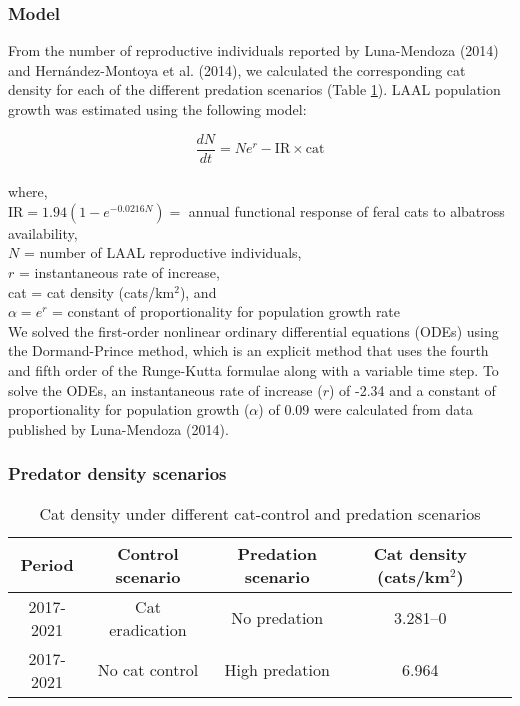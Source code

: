 \documentclass{article}
\begin{document}
\subsubsection*{Model}
From the number of reproductive individuals reported by Luna-Mendoza (2014) and Hernández-Montoya et al. (2014), we calculated the corresponding cat density for each of the different predation scenarios (Table \ref{timeline}). LAAL population growth was estimated using the following model:

\begin{equation}
\frac{dN}{dt} = N  e^{r}-\text{IR}\times \text{cat}
\end{equation}
\\where,\\
$\text{IR} = 1.94(1-e^{- 0.0216 N}) =$ annual functional response of feral cats to albatross availability,\\
$N$ =  number of LAAL reproductive individuals,\\
$r$ =  instantaneous rate of increase,\\
cat = cat density (cats/km$^{2}$), and \\
$\alpha = e^{r}$ = constant of proportionality for population growth rate
\\

We solved the first-order nonlinear ordinary differential equations (ODEs) using the Dormand-Prince method, which is an explicit method that uses the fourth and fifth order of the Runge-Kutta formulae along with a variable time step. To solve the ODEs, an instantaneous rate of increase ($r$) of -2.34 and a constant of proportionality for population growth ($\alpha$) of 0.09 were calculated from data published by Luna-Mendoza (2014).


\subsubsection*{Predator density scenarios}
\begin{table}[H]
\caption{Cat density under different cat-control and predation scenarios}\label{timeline}
\begin{adjustbox}{width=1\textwidth, center}

\begin{tabular}{|c|c|c|c|c|}
\hline
\textbf{Period} & \textbf{Control scenario} & \textbf{Predation scenario} & \textbf{Cat density (cats/km$^{2}$)}\\ \hline
2017-2021& Cat eradication& No predation & 3.281--0\\ \hline
2017-2021& No cat control& High predation& 6.964\\ \hline
  \end{tabular}

\end{adjustbox}
\end{table}
\end{document}
